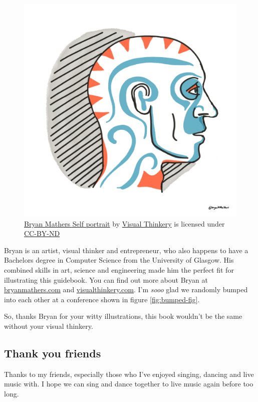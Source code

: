 \documentclass[
]{book}
\begin{document}
\begin{figure}

{\centering \includegraphics[width=0.75\linewidth]{images/self-portrait} 

}

\caption{\href{https://bryanmmathers.com/self-portrait/}{Bryan Mathers Self portrait} by \href{https://visualthinkery.com/}{Visual Thinkery} is licensed under \href{https://creativecommons.org/licenses/by-nd/4.0/}{CC-BY-ND}}\label{fig:selfportrait-fig}
\end{figure}



Bryan is an artist, visual thinker and entrepreneur, who also happens to have a Bachelors degree in Computer Science from the University of Glasgow. His combined skills in art, science and engineering made him the perfect fit for illustrating this guidebook. You can find out more about Bryan at \href{https://bryanmmathers.com}{bryanmathers.com} and \href{https://visualthinkery.com}{visualthinkery.com}. I'm \emph{sooo} glad we randomly bumped into each other at a conference shown in figure \ref{fig:bumped-fig}.

So, thanks Bryan for your witty illustrations, this book wouldn't be the same without your visual thinkery. 🙏

\hypertarget{friends}{%
\subsection{Thank you friends}\label{friends}}

Thanks to my friends, especially those who I've enjoyed singing, dancing and live music with. I hope we can sing and dance together to live music again before too long.
\end{document}
